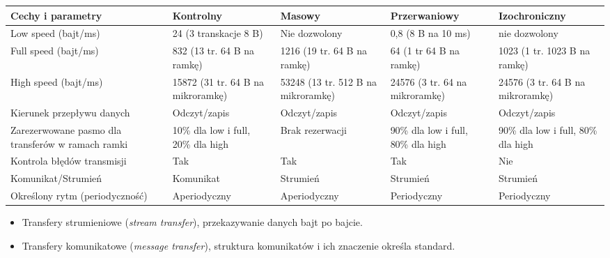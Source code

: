 		\begin{table}[h]
			\begin{tabular}{|p{4cm}|p{3cm}|p{3cm}|p{3cm}|p{3cm}|}
				\hline
				\textbf{Cechy i parametry} & \textbf{Kontrolny}	   & \textbf{Masowy} & \textbf{Przerwaniowy} & \textbf{Izochroniczny} \\ \hline
				Low speed (bajt/ms)  & 24 (3 transkacje 8 B)        & Nie dozwolony      			& 0,8 (8 B na 10 ms)		& nie dozwolony						\\ \hline
				Full speed (bajt/ms) & 832 (13 tr. 64 B na ramkę)   & 1216 (19 tr. 64 B na ramkę)   & 64 (1 tr 64 B na ramkę)	& 1023 (1 tr. 1023 B na ramkę)		\\ \hline
				High speed (bajt/ms) & 15872 (31 tr. 64 B na mikroramkę) & 53248 (13 tr. 512 B na mikroramkę) & 24576 (3 tr. 64 na mikroramkę)	& 24576 (3 tr. 64 B na mikroramkę)	\\ \hline
				Kierunek przepływu danych & Odczyt/zapis            & Odczyt/zapis       			& Odczyt/zapis		& Odczyt/zapis					\\ \hline
				Zarezerwowane pasmo  dla transferów w ramach ramki & 10\% dla low i full, 20\% dla high   & Brak rezerwacji  & 90\% dla low i full, 80\% dla high	& 90\% dla low i full, 80\% dla high	\\ \hline
				Kontrola błędów transmisji & Tak                	& Tak & Tak	& Nie	\\ \hline
				Komunikat/Strumień  & Komunikat		               & Strumień & Strumień   & Strumień	\\ \hline
				Określony rytm (periodyczność) & Aperiodyczny        & Aperiodyczny    & Periodyczny   & Periodyczny	\\ \hline
				\end{tabular}
		\end{table}
				\begin{itemize}
					\item Transfery strumieniowe (\emph{stream transfer}), przekazywanie danych bajt po bajcie.
					\item Transfery komunikatowe (\emph{message transfer}), struktura komunikatów i ich znaczenie określa standard.
				\end{itemize}
				
